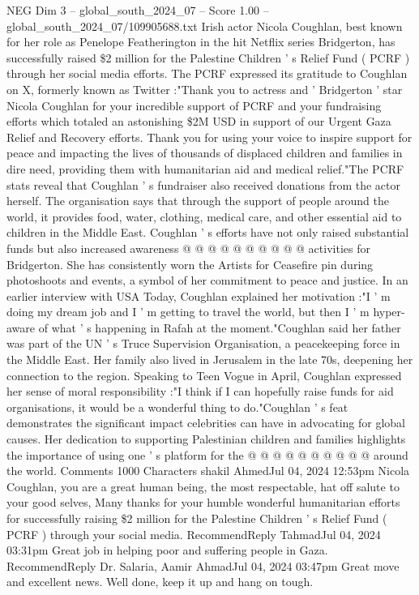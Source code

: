 \begin{textsample}{NEG Dim 3 – global\_south\_2024\_07 – Score 1.00 – global\_south\_2024\_07/109905688.txt}  \label{ex:f3_neg_149}
Irish actor Nicola Coughlan, best known for her role as Penelope Featherington in the hit Netflix series Bridgerton, has successfully raised \$2 million for the Palestine Children ' s Relief Fund ( PCRF ) through her social media efforts.
The PCRF expressed its gratitude to Coughlan on X, formerly known as Twitter :"Thank you to actress and ' Bridgerton ' star Nicola Coughlan for your incredible support of PCRF and your fundraising efforts which totaled an astonishing \$2M USD in support of our Urgent Gaza Relief and Recovery efforts.
Thank you for using your voice to inspire support for peace and impacting the lives of thousands of displaced children and families in dire need, providing them with humanitarian aid and medical relief."The PCRF stats reveal that Coughlan ' s fundraiser also received donations from the actor herself.
The organisation says that through the support of people around the world, it provides food, water, clothing, medical care, and other essential aid to children in the Middle East.
Coughlan ' s efforts have not only raised substantial funds but also increased awareness @ @ @ @ @ @ @ @ @ @ activities for Bridgerton.
She has consistently worn the Artists for Ceasefire pin during photoshoots and events, a symbol of her commitment to peace and justice.
In an earlier interview with USA Today, Coughlan explained her motivation :"I ' m doing my dream job and I ' m getting to travel the world, but then I ' m hyper-aware of what ' s happening in Rafah at the moment."Coughlan said her father was part of the UN ' s Truce Supervision Organisation, a peacekeeping force in the Middle East.
Her family also lived in Jerusalem in the late 70s, deepening her connection to the region.
Speaking to Teen Vogue in April, Coughlan expressed her sense of moral responsibility :"I think if I can hopefully raise funds for aid organisations, it would be a wonderful thing to do."Coughlan ' s feat demonstrates the significant impact celebrities can have in advocating for global causes.
Her dedication to supporting Palestinian children and families highlights the importance of using one ' s platform for the @ @ @ @ @ @ @ @ @ @ around the world.
Comments 1000 Characters shakil AhmedJul 04, 2024 12:53pm Nicola Coughlan, you are a great human being, the most respectable, hat off salute to your good selves, Many thanks for your humble wonderful humanitarian efforts for successfully raising \$2 million for the Palestine Children ' s Relief Fund ( PCRF ) through your social media.
RecommendReply TahmadJul 04, 2024 03:31pm Great job in helping poor and suffering people in Gaza.
RecommendReply Dr.
Salaria, Aamir AhmadJul 04, 2024 03:47pm Great move and excellent news.
Well done, keep it up and hang on tough.

\end{textsample}
